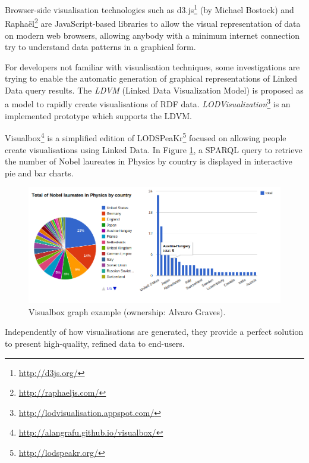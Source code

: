 Browser-side visualisation technologies such as d3.js\footnote{\url{http://d3js.org/}} (by Michael Bostock) and Raphaël\footnote{\url{http://raphaeljs.com/}} are JavaScript-based libraries to allow the visual representation of data on modern web browsers, allowing anybody with a minimum internet connection try to understand data patterns in a graphical form.

For developers not familiar with visualisation techniques, some investigations are trying to enable the automatic generation of graphical representations of Linked Data query results. The \textit{LDVM} (Linked Data Visualization Model) \cite{brunetti2012linked} is proposed as a model to rapidly create visualisations of RDF data. \textit{LODVisualization}\footnote{\url{http://lodvisualisation.appspot.com/}} is an implemented prototype which supports the LDVM.

Visualbox\footnote{\url{http://alangrafu.github.io/visualbox/}} is a simplified edition of LODSPeaKr\footnote{\url{http://lodspeakr.org/}} focused on allowing people create visualisations using Linked Data. In Figure \ref{fig:visualbox}, a SPARQL query to retrieve the number of Nobel laureates in Physics by country is displayed in interactive pie and bar charts.

\begin{figure}
    \center
    \includegraphics[width=\textwidth]{img/ld_approach/graph.png}
    \caption{Visualbox graph example (ownership: Alvaro Graves).}
    \label{fig:visualbox}
\end{figure}

Independently of how visualisations are generated, they provide a perfect solution to present high-quality, refined data to end-users.

